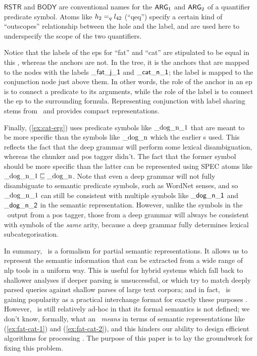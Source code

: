$\mathsf{RSTR}$ and $\mathsf{BODY}$ are conventional names
for the $\mathsf{ARG}_1$ and $\mathsf{ARG}_2$ of a quantifier predicate symbol.  Atoms
like $h_2 =_q l_{42}$ (``qeq'') specify a certain kind of
``outscopes'' relationship between the hole and the label, and are
used here to underspecify the scope of the two quantifiers.

Notice that the labels of the {\sc ep}s for ``fat'' and ``cat'' are
stipulated to be equal in this \rmrs, whereas the anchors are not.  In
the tree, it is the anchors that are mapped to the nodes with the
labels $\mathsf{\_fat\_j\_1}$ and $\mathsf{\_cat\_n\_1}$; the label is
mapped to the conjunction node just above them.  In other words, the
role of the anchor in an {\sc ep} is to connect a predicate to its
arguments, while the role of the label is to connect the {\sc ep} to
the surrounding formula.  Representing conjunction with label sharing
stems from \mrs\ and provides compact representations.

Finally, (\ref{ex:cat-erg}) uses predicate symbols like
$\mathrm{\_dog\_n\_1}$ that are meant to be more specific than the
symbols like $\mathrm{\_dog\_n}$ which the earlier \rmrs s used.
This reflects the fact that the deep grammar will perform some lexical
disambiguation, whereas the chunker and {\sc pos} tagger didn't.  The fact
that the former symbol should be more specific than the latter can be
represented using SPEC atoms like $\mathrm{\_dog\_n\_1}\sqsubseteq
\mathrm{\_dog\_n}$.
Note that even a deep grammar will not fully disambiguate to
semantic predicate symbols, such as WordNet senses, and so
$\mathrm{\_dog\_n\_1}$ can still be consistent with multiple symbols
like $\mathsf{\_dog\_n\_1}$ and $\mathsf{\_dog\_n\_2}$ in the semantic
representation.  However, unlike the symbols in the \rmrs\ output from a
{\sc pos} tagger, those from a deep grammar will always be consistent
with symbols of the {\em same} arity, because a deep grammar
fully determines lexical subcategorisation.

In summary, \rmrs\ is a formalism for partial semantic
representations.  It allows us to represent the semantic information
that can be extracted from a wide range of {\sc nlp} tools in a uniform way.
This is useful for hybrid systems which fall back to shallower
analyses if deeper parsing is unsuccessful, or which try to match
deeply parsed queries against shallow parses of large text corpora;
and in fact, \rmrs\ is gaining popularity as a practical interchange
format for exactly these purposes \cite{copestake:2003,frank:2004}.
However, \rmrs\ is still relatively ad-hoc in that its
formal semantics is
not defined; we don't know, formally, what an \rmrs\ \emph{means} in
terms of semantic representations like (\ref{ex:fat-cat-1}) and
(\ref{ex:fat-cat-2}), and this hinders our ability to design efficient
algorithms for processing \rmrs. The purpose of this paper is to lay
the groundwork for fixing this problem.

